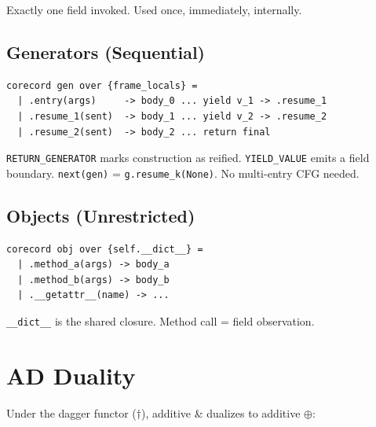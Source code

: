 \documentclass[11pt,a4paper]{article}
\begin{document}
Exactly one field invoked. Used once, immediately, internally.

\subsection{Generators (Sequential)}

\begin{lstlisting}
corecord gen over {frame_locals} =
  | .entry(args)     -> body_0 ... yield v_1 -> .resume_1
  | .resume_1(sent)  -> body_1 ... yield v_2 -> .resume_2
  | .resume_2(sent)  -> body_2 ... return final
\end{lstlisting}

\texttt{RETURN\_GENERATOR} marks construction as reified.
\texttt{YIELD\_VALUE} emits a field boundary.
\texttt{next(gen)} = \texttt{g.resume\_k(None)}.
No multi-entry CFG needed.

\subsection{Objects (Unrestricted)}

\begin{lstlisting}
corecord obj over {self.__dict__} =
  | .method_a(args) -> body_a
  | .method_b(args) -> body_b
  | .__getattr__(name) -> ...
\end{lstlisting}

\texttt{\_\_dict\_\_} is the shared closure.
Method call = field observation.

\section{AD Duality}

Under the dagger functor ($\dagger$), additive \& dualizes to
additive $\oplus$:
\end{document}
